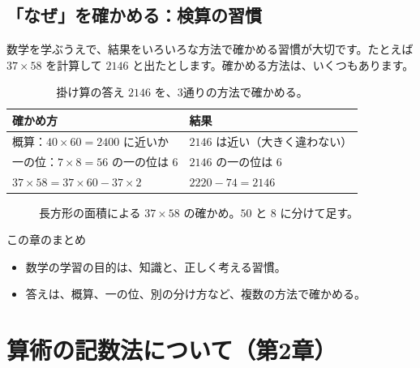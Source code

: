\documentclass[a4paper,11pt,openany]{ltjsbook}
\begin{document}
\section{「なぜ」を確かめる：検算の習慣}

数学を学ぶうえで、結果をいろいろな方法で確かめる習慣が大切です。たとえば $37\times58$ を計算して $2146$ と出たとします。確かめる方法は、いくつもあります。

\begin{table}[htbp]
\centering
\begin{tabular}{ll}
\toprule
確かめ方 & 結果\\
\midrule
概算：$40\times60=2400$ に近いか & $2146$ は近い（大きく違わない）\\
一の位：$7\times8=56$ の一の位は 6 & $2146$ の一の位は 6\\
$37\times58=37\times60-37\times2$ & $2220-74=2146$\\
\bottomrule
\end{tabular}
\caption{掛け算の答え $2146$ を、3通りの方法で確かめる。}
\end{table}

\begin{figure}[htbp]
\centering
{}
\caption{長方形の面積による $37\times58$ の確かめ。$50$ と $8$ に分けて足す。}
\end{figure}

\begin{pointbox}{この章のまとめ}
\begin{itemize}[leftmargin=*]
\item 数学の学習の目的は、知識と、正しく考える習慣。
\item 答えは、概算、一の位、別の分け方など、複数の方法で確かめる。
\end{itemize}
\end{pointbox}

\chapter{算術の記数法について（第2章）}
\end{document}
